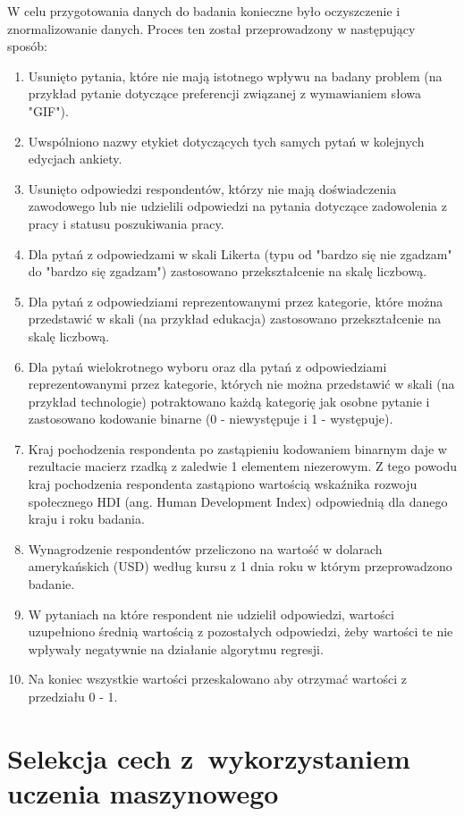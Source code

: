 W celu przygotowania danych do badania konieczne było oczyszczenie i znormalizowanie danych. Proces ten został przeprowadzony w następujący sposób:
\begin{enumerate}
    \item Usunięto pytania, które nie mają istotnego wpływu na badany problem (na przykład pytanie dotyczące preferencji związanej z wymawianiem słowa "GIF").
    \item Uwspólniono nazwy etykiet dotyczących tych samych pytań w kolejnych edycjach ankiety.
    \item Usunięto odpowiedzi respondentów, którzy nie mają doświadczenia zawodowego lub nie udzielili odpowiedzi na pytania dotyczące zadowolenia z pracy i statusu poszukiwania pracy.
    \item Dla pytań z odpowiedzami w skali Likerta (typu od "bardzo się nie zgadzam" do "bardzo się zgadzam") zastosowano przekształcenie na skalę liczbową.
    \item Dla pytań z odpowiedziami reprezentowanymi przez kategorie, które można przedstawić w skali (na przykład edukacja) zastosowano przekształcenie na skalę liczbową.
    \item Dla pytań wielokrotnego wyboru oraz dla pytań z odpowiedziami reprezentowanymi przez kategorie, których nie można przedstawić w skali (na przykład technologie) potraktowano każdą kategorię jak osobne pytanie i zastosowano kodowanie binarne (0 - niewystępuje i 1 - występuje).
    \item Kraj pochodzenia respondenta po zastąpieniu kodowaniem binarnym daje w rezultacie macierz rzadką z zaledwie 1 elementem niezerowym. Z tego powodu kraj pochodzenia respondenta zastąpiono wartością wskaźnika rozwoju społecznego HDI (ang. Human Development Index) \cite{hdi} odpowiednią dla danego kraju i roku badania.
    \item Wynagrodzenie respondentów przeliczono na wartość w dolarach amerykańskich (USD) według kursu z 1 dnia roku w którym przeprowadzono badanie.
    \item W pytaniach na które respondent nie udzielił odpowiedzi, wartości uzupełniono średnią wartością z pozostałych odpowiedzi, żeby wartości te nie wpływały negatywnie na działanie algorytmu regresji.
    \item Na koniec wszystkie wartości przeskalowano aby otrzymać wartości z przedziału 0 - 1.
    \end{enumerate}

\section{Selekcja cech z~wykorzystaniem uczenia maszynowego}\label{sec:analysis:feature-selection-xgb}

